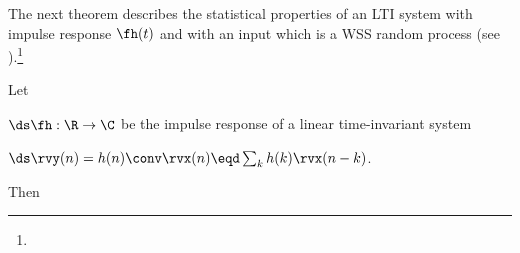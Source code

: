 The next theorem describes the statistical properties of an LTI system
with impulse response $\fh(t)$ and with an input which is a
WSS random process
(see ).\footnote{}
\begin{theorem}
Let
\begin{liste}
   \item $\ds \fh:\R\to\C$ be the impulse response of a linear time-invariant system
   \item $\ds\rvy(n)=h(n) \conv \rvx(n) \eqd \sum_k h(k)\rvx(n-k)$.
\end{liste}
Then
\end{theorem}
